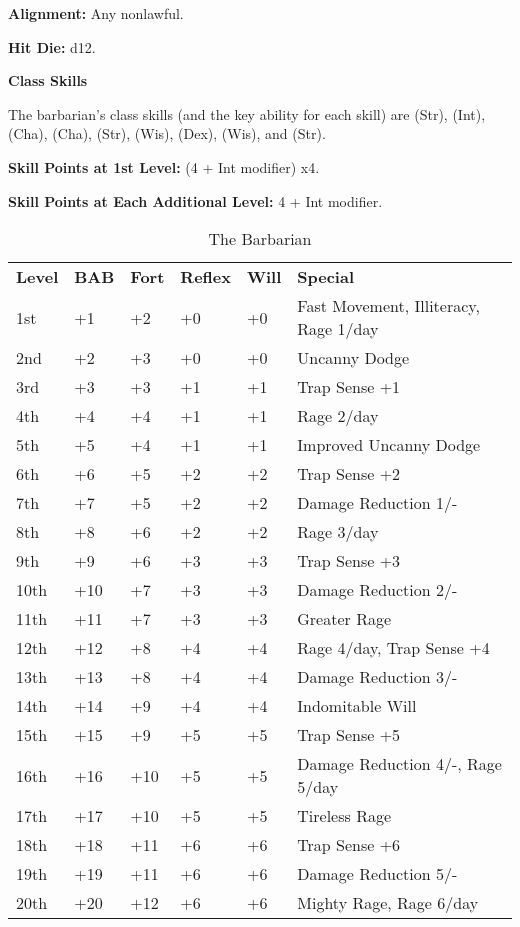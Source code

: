 
\textbf{Alignment:} Any nonlawful.

\textbf{Hit Die:} d12.

\textbf{Class Skills}

The barbarian's class skills (and the key ability for each skill) are  (Str), 
 (Int),  (Cha),  (Cha),  (Str),  (Wis),  
(Dex),  (Wis), and  (Str).

\textbf{Skill Points at 1st Level:} (4 + Int modifier) x4.

\textbf{Skill Points at Each Additional Level:} 4 + Int modifier.

\begin{table}[htb]
\caption{The Barbarian}
\centering
\begin{tabular}{*{6}{l}}
\textbf{Level} & \textbf{BAB} & \textbf{Fort} & \textbf{Reflex} & \textbf{Will} & \textbf{Special} \\
1st & +1 & +2 & +0 & +0 & Fast Movement, Illiteracy, Rage 1/day \\
2nd & +2 & +3 & +0 & +0 & Uncanny Dodge \\
3rd & +3 & +3 & +1 & +1 & Trap Sense +1 \\
4th & +4 & +4 & +1 & +1 & Rage 2/day \\
5th & +5 & +4 & +1 & +1 & Improved Uncanny Dodge \\
6th & +6 & +5 & +2 & +2 & Trap Sense +2 \\
7th & +7 & +5 & +2 & +2 & Damage Reduction 1/- \\
8th & +8 & +6 & +2 & +2 & Rage 3/day \\
9th & +9 & +6 & +3 & +3 & Trap Sense +3 \\
10th & +10 & +7 & +3 & +3 & Damage Reduction 2/- \\
11th & +11 & +7 & +3 & +3 & Greater Rage \\
12th & +12 & +8 & +4 & +4 & Rage 4/day, Trap Sense +4 \\
13th & +13 & +8 & +4 & +4 & Damage Reduction 3/- \\
14th & +14 & +9 & +4 & +4 & Indomitable Will \\
15th & +15 & +9 & +5 & +5 & Trap Sense +5 \\
16th & +16 & +10 & +5 & +5 & Damage Reduction 4/-, Rage 5/day \\
17th & +17 & +10 & +5 & +5 & Tireless Rage \\
18th & +18 & +11 & +6 & +6 & Trap Sense +6 \\
19th & +19 & +11 & +6 & +6 & Damage Reduction 5/- \\
20th & +20 & +12 & +6 & +6 & Mighty Rage, Rage 6/day \\
\end{tabular}
\end{table}


